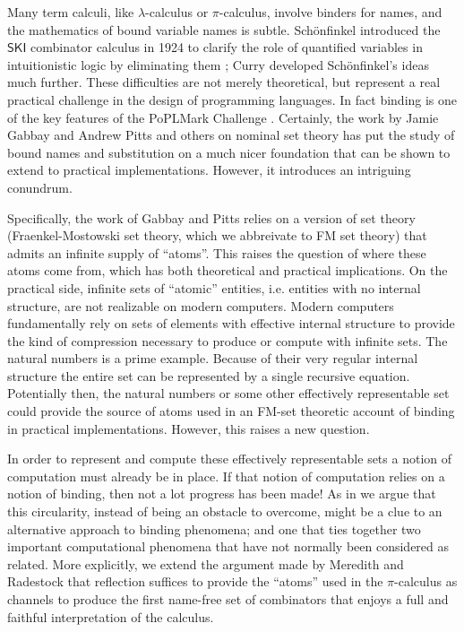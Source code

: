 \documentclass[submission,copyright,creativecommons]{eptcs}
\newcommand{\pic}{$\pi$-calculus}
\theoremstyle{definition}
\theoremstyle{remark}
\theoremstyle{remark}
\begin{document}
Many term calculi, like $\lambda$-calculus or {\pic}, involve binders
for names, and the mathematics of bound variable names is
subtle. Sch\"onfinkel introduced the $\mathsf{SKI}$ combinator
calculus in 1924 to clarify the role of quantified variables in
intuitionistic logic by eliminating them \cite{finkel}; Curry
developed Sch\"onfinkel's ideas much further. These difficulties are not
merely theoretical, but represent a real practical challenge in the
design of programming languages. In fact binding is one of the key
features of the PoPLMark Challenge \cite{PoPLMark}. Certainly, the
work by Jamie Gabbay and Andrew Pitts
\cite{DBLP:journals/fac/GabbayP02} and others
\cite{DBLP:journals/jcss/Clouston14} on nominal set theory has put the
study of bound names and substitution on a much nicer foundation that
can be shown to extend to practical implementations. However, it
introduces an intriguing conundrum.

Specifically, the work of Gabbay and Pitts relies on a version of set
theory (Fraenkel-Mostowski set theory, which we abbreivate to FM set
theory) that admits an infinite supply of ``atoms''. This raises the
question of where these atoms come from, which has both theoretical
and practical implications. On the practical side, infinite sets of
``atomic'' entities, i.e. entities with no internal structure, are not
realizable on modern computers. Modern computers fundamentally rely on
sets of elements with effective internal structure to provide the kind
of compression necessary to produce or compute with infinite sets. The
natural numbers is a prime example. Because of their very regular
internal structure the entire set can be represented by a single
recursive equation. Potentially then, the natural numbers or some
other effectively representable set could provide the source of atoms
used in an FM-set theoretic account of binding in practical
implementations. However, this raises a new question.

In order to represent and compute these effectively representable sets
a notion of computation must already be in place. If that notion of
computation relies on a notion of binding, then not a lot progress has
been made! As in \cite{DBLP:journals/entcs/MeredithR05} we argue that
this circularity, instead of being an obstacle to overcome, might be a
clue to an alternative approach to binding phenomena; and one that
ties together two important computational phenomena that have not
normally been considered as related. More explicitly, we extend the
argument made by Meredith and Radestock that reflection suffices to
provide the ``atoms'' used in the {\pic} as channels to produce the
first name-free set of combinators that enjoys a full and faithful
interpretation of the calculus.
\end{document}
